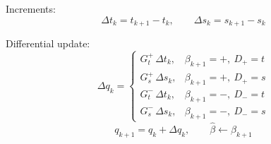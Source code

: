\documentclass[11pt,a4paper]{article}
\begin{document}
\begin{algorithm}[H]
\begin{algorithmic}[1]
    \State Increments:
    \[
    \Delta t_k=t_{k+1}-t_k,\qquad
    \Delta s_k=s_{k+1}-s_k
    \]

    \State Differential update:
    \[
    \Delta q_k=
    \begin{cases}
    G_t^+\,\Delta t_k, & \beta_{k+1}=+,\ D_+=t\\
    G_s^+\,\Delta s_k, & \beta_{k+1}=+,\ D_+=s\\
    G_t^-\,\Delta t_k, & \beta_{k+1}=-,\ D_-=t\\
    G_s^-\,\Delta s_k, & \beta_{k+1}=-,\ D_-=s
    \end{cases}
    \]
    \[
    q_{k+1}=q_k+\Delta q_k,\qquad
    \hat\beta\gets\beta_{k+1}
    \]
\EndFor

\end{algorithmic}
\end{algorithm}
\end{document}
